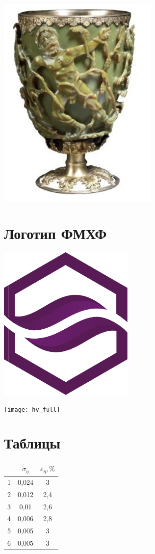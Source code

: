 \documentclass[a4paper,12pt]{article}
\begin{document}
\includegraphics[draft]{cup}


\section{Логотип ФМХФ}

\includegraphics[width=0.5\textwidth]{DCMP} 

\texttt{[image: hv\_full]}

\section{Таблицы}

\begin{tabular}{|c|c|c|}
\hline 
 & $\sigma _{\eta}$ & $\varepsilon _{\eta}, \%$ \\ 
\hline 
1 & 0,024 & 3 \\ 
\hline 
2 & 0,012 & 2,4 \\ 
\hline 
3 & 0,01 & 2,6 \\ 
\hline 
4 & 0,006 & 2,8 \\ 
\hline 
5 & 0,005 & 3 \\ 
\hline 
6 & 0,005 & 3 \\ 
\hline 
\end{tabular} 
\end{document}

